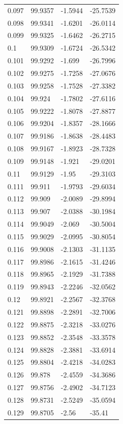 \begin{tabular}{llll}
0.097 & 99.9357 & -1.5944 & -25.7539 \\
0.098 & 99.9341 & -1.6201 & -26.0114 \\
0.099 & 99.9325 & -1.6462 & -26.2715 \\
0.1 & 99.9309 & -1.6724 & -26.5342 \\
0.101 & 99.9292 & -1.699 & -26.7996 \\
0.102 & 99.9275 & -1.7258 & -27.0676 \\
0.103 & 99.9258 & -1.7528 & -27.3382 \\
0.104 & 99.924 & -1.7802 & -27.6116 \\
0.105 & 99.9222 & -1.8078 & -27.8877 \\
0.106 & 99.9204 & -1.8357 & -28.1666 \\
0.107 & 99.9186 & -1.8638 & -28.4483 \\
0.108 & 99.9167 & -1.8923 & -28.7328 \\
0.109 & 99.9148 & -1.921 & -29.0201 \\
0.11 & 99.9129 & -1.95 & -29.3103 \\
0.111 & 99.911 & -1.9793 & -29.6034 \\
0.112 & 99.909 & -2.0089 & -29.8994 \\
0.113 & 99.907 & -2.0388 & -30.1984 \\
0.114 & 99.9049 & -2.069 & -30.5004 \\
0.115 & 99.9029 & -2.0995 & -30.8054 \\
0.116 & 99.9008 & -2.1303 & -31.1135 \\
0.117 & 99.8986 & -2.1615 & -31.4246 \\
0.118 & 99.8965 & -2.1929 & -31.7388 \\
0.119 & 99.8943 & -2.2246 & -32.0562 \\
0.12 & 99.8921 & -2.2567 & -32.3768 \\
0.121 & 99.8898 & -2.2891 & -32.7006 \\
0.122 & 99.8875 & -2.3218 & -33.0276 \\
0.123 & 99.8852 & -2.3548 & -33.3578 \\
0.124 & 99.8828 & -2.3881 & -33.6914 \\
0.125 & 99.8804 & -2.4218 & -34.0283 \\
0.126 & 99.878 & -2.4559 & -34.3686 \\
0.127 & 99.8756 & -2.4902 & -34.7123 \\
0.128 & 99.8731 & -2.5249 & -35.0594 \\
0.129 & 99.8705 & -2.56 & -35.41 \\

\end{tabular}
